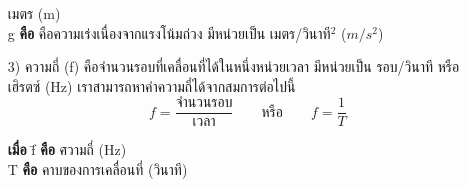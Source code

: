 \begin{itemize}[leftmargin=*]
\begin{tabbing}
										\>			\>				\>เมตร (m)\\
										\>g			\>\textbf{คือ} 	\>คือความเร่งเนื่องจากแรงโน้มถ่วง มีหน่วยเป็น เมตร/วินาที$^2$ ($m/s^2$)
				\end{tabbing}
	\item[3)] 	ความถี่ (f)  คือจำนวนรอบที่เคลื่อนที่ได้ในหนึ่งหน่วยเวลา  มีหน่วยเป็น  รอบ/วินาที หรือเฮิรตซ์ (Hz) เราสามารถหาค่าความถี่ได้จากสมการต่อไปนี้\\
				\[ f = \frac{\text{จำนวนรอบ}}{\text{เวลา}} \qquad	\text{หรือ}	\qquad	f = \frac{1}{T}\]
				\begin{tabbing}
					\textbf{เมื่อ} \quad 	\=f \quad 	\=\textbf{คือ} 	\=ความถี่ (Hz)\\
										\>T 		\>\textbf{คือ} 	\>คาบของการเคลื่อนที่  (วินาที)
				\end{tabbing}
\end{itemize}
